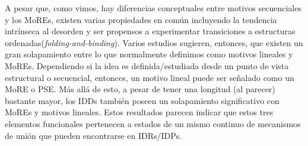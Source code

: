% 
A pesar que, como vimos, hay diferencias conceptuales entre motivos secuenciales y los MoREs, existen varias propiedades en común incluyendo la tendencia intrínseca al desorden 
y ser propensos a experimentar transiciones a estructuras ordenadas(\textit{folding-and-binding}). 
Varios estudios sugieren, entonces, que existen un gran solapamiento entre lo que normalmente definimos como motivos lineales y MoREs\cite{fuxreiter2007local,meszaros2012disordered}.
Dependiendo si la idea es definida/estudiada desde un punto de vista estructural o secuencial, entonces, un motivo lineal puede ser señalado como un MoRE o PSE.
Más allá de esto, a pesar de tener una longitud (al parecer) bastante mayor, los IDDs también poseen un solapamiento significativo con MoREs y motivos lineales.
Estos resultados parecen indicar que estos tres elementos funcionales pertenecen a estados de un mismo continuo de mecanismos de unión que pueden encontrarse en IDRs/IDPs.



